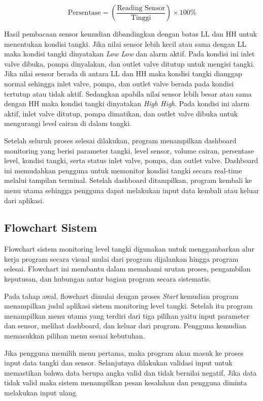 \documentclass[12pt,a4paper]{article}
\begin{document}
$$\text{Persentase} = \left(\frac{\text{Reading Sensor}}{\text{Tinggi}}\right) \times 100\%$$

Hasil pembacaan sensor kemudian dibandingkan dengan batas LL dan HH untuk menentukan kondisi tangki. Jika nilai sensor lebih kecil atau sama dengan LL maka kondisi tangki dinyatakan \textit{Low Low} dan alarm aktif. Pada kondisi ini inlet valve dibuka, pompa dinyalakan, dan outlet valve ditutup untuk mengisi tangki. Jika nilai sensor berada di antara LL dan HH maka kondisi tangki dianggap normal sehingga inlet valve, pompa, dan outlet valve berada pada kondisi tertutup atau tidak aktif. Sedangkan apabila nilai sensor lebih besar atau sama dengan HH maka kondisi tangki dinyatakan \textit{High High}. Pada kondisi ini alarm aktif, inlet valve ditutup, pompa dimatikan, dan outlet valve dibuka untuk mengurangi level cairan di dalam tangki.

Setelah seluruh proses selesai dilakukan, program menampilkan dashboard monitoring yang berisi parameter tangki, level sensor, volume cairan, persentase level, kondisi tangki, serta status inlet valve, pompa, dan outlet valve. Dashboard ini memudahkan pengguna untuk memonitor kondisi tangki secara real-time melalui tampilan terminal. Setelah dashboard ditampilkan, program kembali ke menu utama sehingga pengguna dapat melakukan input data kembali atau keluar dari aplikasi.

\subsection{Flowchart Sistem}

Flowchart sistem monitoring level tangki digunakan untuk menggambarkan alur kerja program secara visual mulai dari program dijalankan hingga program selesai. Flowchart ini membantu dalam memahami urutan proses, pengambilan keputusan, dan hubungan antar bagian program secara sistematis.

Pada tahap awal, flowchart dimulai dengan proses \textit{Start} kemudian program menampilkan judul aplikasi sistem monitoring level tangki. Setelah itu program menampilkan menu utama yang terdiri dari tiga pilihan yaitu input parameter dan sensor, melihat dashboard, dan keluar dari program. Pengguna kemudian memasukkan pilihan menu sesuai kebutuhan.

Jika pengguna memilih menu pertama, maka program akan masuk ke proses input data tangki dan sensor. Selanjutnya dilakukan validasi input untuk memastikan bahwa data berupa angka valid dan tidak bernilai negatif. Jika data tidak valid maka sistem menampilkan pesan kesalahan dan pengguna diminta melakukan input ulang.
\end{document}
